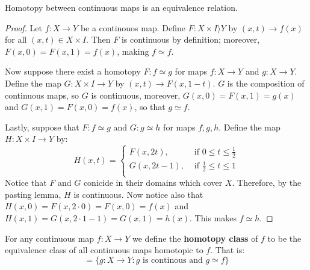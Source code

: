 \begin{lemma}\label{2.1.2}
    Homotopy between continuous maps is an equivalence relation.
\end{lemma}
\begin{proof}
    Let $f:X \xrightarrow{} Y$ be a continouos map. Define $F:X \times I \rangle
    Y$ by $(x,t) \xrightarrow{} f(x)$ for all $(x,t) \in X \times I$. Then $F$
    is continuous by definition; moreover,  $F(x,0)=F(x,1)=f(x)$, making $f
    \simeq f$.

    Now suppose there exist a homotopy $F:f \simeq g$ for maps  $f:X
    \xrightarrow{} Y$ and $g:X \xrightarrow{} Y$. Define the map $G:X \times I
    \xrightarrow{} Y$ by $(x,t) \xrightarrow{} F(x,1-t)$. $G$ is the composition
    of continuous maps, so  $G$ is continuous, moreover,  $G(x,0)=F(x,1)=g(x)$
    and $G(x,1)=F(x,0)=f(x)$, so that $g \simeq f$.

    Lastly, suppose that  $F:f \simeq g$ and  $G:g \simeq h$ for maps $f,g,h$.
    Define the map $H:X \times I \xrightarrow{} Y$ by:
    \begin{equation*}
        H(x,t)  =  \begin{cases}
                        F(x,2t),    & \text{ if } 0 \leq t \leq \frac{1}{2}  \\
                        G(x,2t-1),  & \text{ if } \frac{1}{2} \leq t \leq 1 \\
                   \end{cases}
    \end{equation*}
    Notice that $F$ and  $G$ conicide in their domains which cover  $X$.
    Therefore, by the pasting lemma,  $H$ is continuous. Now notice also that
    $H(x,0)=F(x,2 \cdot 0)=F(x,0)=f(x)$ and $H(x,1)=G(x,2 \cdot
    1-1)=G(x,1)=h(x)$. This makes $f \simeq h$.
\end{proof}

\begin{definition}
    For any continuous map $f:X \xrightarrow{} Y$ we define the \textbf{homotopy
    class} of $f$ to be the equivalence class of all continuous maps homotopic
    to  $f$. That is:
    \begin{equation*}
    [f]=\{g: X \xrightarrow{} Y : g \text{ is continous and } g \simeq f\}
    \end{equation*}
\end{definition}

